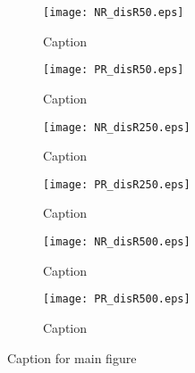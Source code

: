 \begin{figure}[H]
    \centering
    \begin{subfigure}[b]{0.49\textwidth}
        \centering
        \texttt{[image: NR\_disR50.eps]}
        \caption{Caption}
        \label{fig:NR50}
    \end{subfigure}
    \hfill
    \begin{subfigure}[b]{0.49\textwidth}
        \centering
        \texttt{[image: PR\_disR50.eps]}
        \caption{Caption}
        \label{fig:NR250}
    \end{subfigure}
    \begin{subfigure}[b]{0.49\textwidth}
        \centering
        \texttt{[image: NR\_disR250.eps]}
        \caption{Caption}
        \label{fig:NR500}
    \end{subfigure}
    \hfill
    \begin{subfigure}[b]{0.49\textwidth}
        \centering
        \texttt{[image: PR\_disR250.eps]}
        \caption{Caption}
        \label{fig:PR50}
    \end{subfigure}
    \hfill
    \begin{subfigure}[b]{0.49\textwidth}
        \centering
        \texttt{[image: NR\_disR500.eps]}
        \caption{Caption}
        \label{fig:PR250}
    \end{subfigure}
    \hfill
    \begin{subfigure}[b]{0.49\textwidth}
        \centering
        \texttt{[image: PR\_disR500.eps]}
        \caption{Caption}
        \label{fig:PR500}
    \end{subfigure}
    \caption{Caption for main figure}
    \label{fig:NR}
\end{figure}

